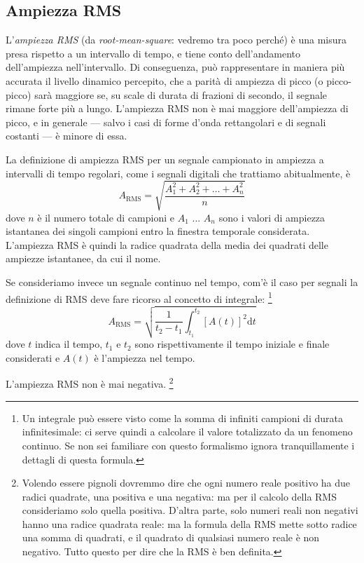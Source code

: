 \subsection{Ampiezza RMS}

L'\emph{ampiezza RMS} (da \emph{root-mean-square}: vedremo tra poco perché) è una misura presa rispetto a un intervallo di tempo, e tiene conto dell'andamento dell'ampiezza nell'intervallo. Di conseguenza, può rappresentare in maniera più accurata il livello dinamico percepito, che a parità di ampiezza di picco (o picco-picco) sarà maggiore se, su scale di durata di frazioni di secondo, il segnale rimane forte più a lungo. L'ampiezza RMS non è mai maggiore dell'ampiezza di picco, e in generale --- salvo i casi di forme d'onda rettangolari e di segnali costanti --- è minore di essa.

La definizione di ampiezza RMS per un segnale campionato in ampiezza a intervalli di tempo regolari, come i segnali digitali che trattiamo abitualmente, è
\begin{equation}\label{eq:rms}
A_{\text{RMS}} = \sqrt{\frac{A_1^2+A_2^2+\ldots+A_n^2}{n}}
\end{equation}
dove $n$ è il numero totale di campioni e $A_1$ ... $A_n$ sono i valori di ampiezza istantanea dei singoli campioni entro la finestra temporale considerata. L'ampiezza RMS è quindi la radice quadrata della media dei quadrati delle ampiezze istantanee, da cui il nome. 

Se consideriamo invece un segnale continuo nel tempo, com'è il caso per segnali 
la definizione di RMS deve fare ricorso al concetto di integrale:%
\footnote{Un integrale può essere visto come la somma di infiniti campioni di durata infinitesimale: ci serve quindi a calcolare il valore totalizzato da un fenomeno continuo. Se non sei familiare con questo formalismo ignora tranquillamente i dettagli di questa formula.}
\begin{equation*}
A_{\textrm{RMS}} = \sqrt{\frac{1}{t_2-t_1}\int_{t_1}^{t_2}[A(t)]^2\textrm{d}t}
\end{equation*}
dove $t$ indica il tempo, $t_1$ e $t_2$ sono rispettivamente il tempo iniziale e finale considerati e $A(t)$ è l'ampiezza nel tempo.

L'ampiezza RMS non è mai negativa.%
\footnote{Volendo essere pignoli dovremmo dire che ogni numero reale positivo ha due radici quadrate, una positiva e una negativa: ma per il calcolo della RMS consideriamo solo quella positiva. D'altra parte, solo numeri reali non negativi hanno una radice quadrata reale: ma la formula della RMS mette sotto radice una somma di quadrati, e il quadrato di qualsiasi numero reale è non negativo. Tutto questo per dire che la RMS è ben definita.}


